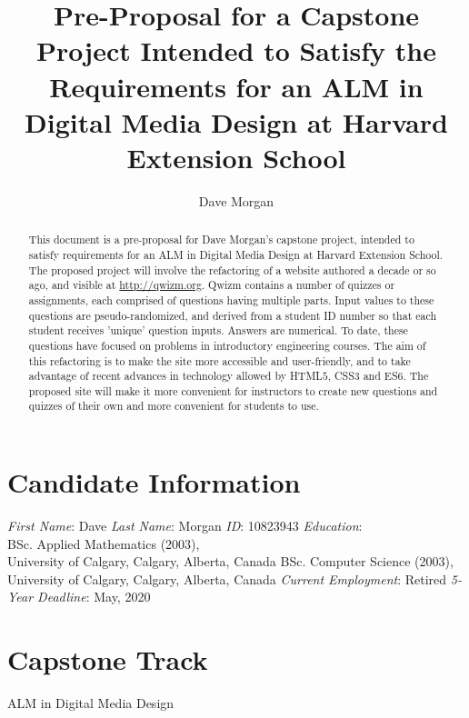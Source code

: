 \documentclass{tufte-handout}
\title{Pre-Proposal for a Capstone Project Intended to Satisfy the Requirements for an ALM in Digital Media Design at Harvard Extension School}
\author[Dave Morgan]{Dave Morgan}
\begin{document}
\raggedright
\maketitle%

\begin{abstract}
	This document is a pre-proposal for Dave Morgan's capstone project, intended to satisfy requirements for an ALM in Digital Media Design at Harvard Extension School. The proposed project will involve the refactoring of a website authored a decade or so ago, and visible at \url{http://qwizm.org}.
	\parm\noindent
	Qwizm contains a number of quizzes or assignments, each comprised of questions having multiple parts. Input values to these questions are pseudo-randomized, and derived from a student ID number so that each student receives 'unique' question inputs. Answers are numerical.  To date, these questions have focused on problems in introductory engineering courses.
	\parm\noindent
	The aim of this refactoring is to make the site more accessible and user-friendly, and to take advantage of recent advances in technology allowed by HTML$5$, CSS$3$ and ES$6$. The proposed site will make it more convenient for instructors to create new questions and quizzes of their own and more convenient for students to use.

\end{abstract}


\section{Candidate Information}\label{sec:candidate}
\emph{First Name}: Dave \parm
\emph{Last Name}: Morgan \parm
\emph{ID}: 10823943 \parm
\emph{Education}: \\
\hspace{0.5cm}BSc. Applied Mathematics (2003), \\
\hspace{0.5cm}University of Calgary, Calgary, Alberta, Canada \parm
\hspace{0.5cm}BSc. Computer Science (2003), \\
\hspace{0.5cm}University of Calgary, Calgary, Alberta, Canada \parm
\emph{Current Employment}: Retired \parm
\emph{5-Year Deadline}: May, 2020 \parb

\section{Capstone Track}
	ALM in Digital Media Design
\end{document}
